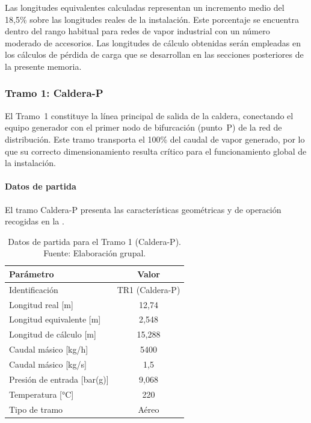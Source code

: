 \documentclass[12pt]{article}
\begin{document}
Las longitudes equivalentes calculadas representan un incremento medio del 18,5\% sobre las longitudes reales de la instalación. Este porcentaje se encuentra dentro del rango habitual para redes de vapor industrial con un número moderado de accesorios. Las longitudes de cálculo obtenidas serán empleadas en los cálculos de pérdida de carga que se desarrollan en las secciones posteriores de la presente memoria.

\subsubsection{Tramo 1: Caldera-P}
\label{subsubsec:tramo1-caldera-p}

El Tramo~1 constituye la línea principal de salida de la caldera, conectando el equipo generador con el primer nodo de bifurcación (punto~P) de la red de distribución. Este tramo transporta el 100\% del caudal de vapor generado, por lo que su correcto dimensionamiento resulta crítico para el funcionamiento global de la instalación.

\paragraph{Datos de partida}

El tramo Caldera-P presenta las características geométricas y de operación recogidas en la .

\begin{table}[H]
	\centering
	\caption{Datos de partida para el Tramo 1 (Caldera-P). Fuente: Elaboración grupal.}
	\label{tab:datos-partida-tramo1}
	\begin{tabular}{lc}
		\toprule
		\textbf{Parámetro}          & \textbf{Valor}  \\
		\midrule
		Identificación              & TR1 (Caldera-P) \\
		Longitud real [m]           & 12,74           \\
		Longitud equivalente [m]    & 2,548           \\
		Longitud de cálculo [m]     & 15,288          \\
		Caudal másico [kg/h]        & 5400            \\
		Caudal másico [kg/s]        & 1,5             \\
		Presión de entrada [bar(g)] & 9,068           \\
		Temperatura [°C]            & 220             \\
		Tipo de tramo               & Aéreo           \\
		\bottomrule
	\end{tabular}
\end{table}
\end{document}
